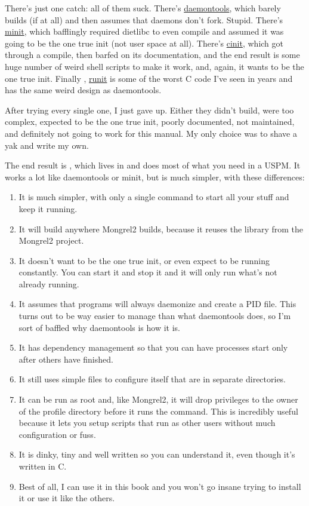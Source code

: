 There's just one catch: all of them suck.  There's \href{http://cr.yp.to/daemontools.html}{daemontools},
which barely builds (if at all) and then assumes that daemons don't fork.  Stupid.  There's
\href{http://www.fefe.de/minit/}{minit}, which bafflingly required dietlibc to even compile
and assumed it was going to be the one true init (not user space at all).  There's
\href{http://www.nico.schottelius.org/software/cinit/}{cinit}, which got through a compile,
then barfed on its documentation, and the end result is some huge number of weird
shell scripts to make it work, and, again, it wants to be the one true init.  Finally ,
\href{http://smarden.org/runit/}{runit} is some of the worst C code I've seen in years and
has the same weird design as daemontools.

After trying every single one, I just gave up.  Either they didn't build, were too complex,
expected to be the one true init, poorly documented, not maintained, and definitely not
going to work for this manual.  My only choice was to shave a yak and write my own.

The end result is , which lives in  and does
most of what you need in a USPM\@.  It works a lot like daemontools or minit, but
is much simpler, with these differences:

\begin{enumerate}
\item It is much simpler, with only a single command to start all your stuff and
    keep it running.
\item It will build anywhere Mongrel2 builds, because it reuses the 
    library from the Mongrel2 project.
\item It doesn't want to be the one true init, or even expect to be running constantly.
    You can start it and stop it and it will only run what's not already running.
\item It assumes that programs will always daemonize and create a PID file.  This turns
    out to be way easier to manage than what daemontools does, so I'm sort of baffled why
    daemontools is how it is.
\item It has dependency management so that you can have processes start only after others
    have finished.
\item It still uses simple files to configure itself that are in separate directories.
\item It can be run as root and, like Mongrel2, it will drop privileges to the owner
    of the profile directory before it runs the command.  This is incredibly useful because
    it lets you setup scripts that run as other users without much configuration or fuss.
\item It is dinky, tiny and well written so you can understand it, even though it's written
    in C.
\item Best of all, I can use it in this book and you won't go insane trying to install it
    or use it like the others.
\end{enumerate}

